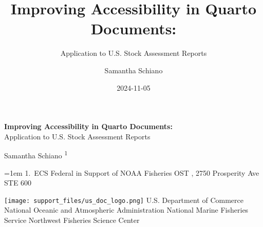 \documentclass[
]{scrartcl}
\title{Improving Accessibility in Quarto Documents:}
\subtitle{Application to U.S. Stock Assessment Reports}
\author{Samantha Schiano}
\date{2024-11-05}
\begin{document}
  \begin{titlepage}

  \begin{minipage}[b][\textheight][s]{\textwidth}
  \raggedright




  {\huge\bfseries\nohyphens{Improving Accessibility in Quarto
  Documents:}}\\[1\baselineskip]
  {\large{Application to U.S. Stock Assessment
  Reports}}\\[4\baselineskip]

  \vspace{1\baselineskip}


  \vspace{1\baselineskip}

  {\large{Samantha Schiano}}%
  {\textsuperscript{1}}%



  \vspace{2\baselineskip}

  \hangindent=1em
  {1}.~{ECS Federal in Support of NOAA Fisheries OST}%
  , %
  {2750 Prosperity Ave STE 600}%


  \vspace{1\baselineskip}



  \vfill


  \vspace{1\baselineskip}

  \texttt{[image: support\_files/us\_doc\_logo.png]}\newline
  U.S. Department of Commerce\newline
  National Oceanic and Atmospheric Administration\newline
  National Marine Fisheries Service\newline
  Northwest Fisheries Science Center\newline

  \end{minipage}
  \restoregeometry
  \end{titlepage}
\end{document}
